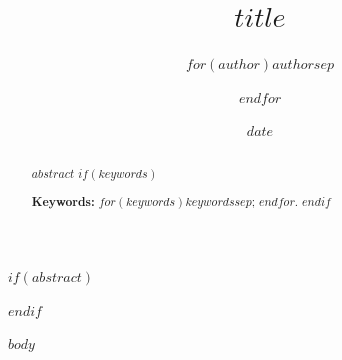 \documentclass[11pt]{article}
\title{\Large\bfseries $title$}
\author{$for(author)$$author$$sep$ \and $endfor$}
\date{$date$}
\begin{document}
\maketitle

$if(abstract)$
\begin{abstract}
\noindent $abstract$
$if(keywords)$

\vspace{0.8em}
\noindent\textbf{Keywords:} $for(keywords)$$keywords$$sep$; $endfor$.
$endif$
\end{abstract}
$endif$

$body$
\end{document}
